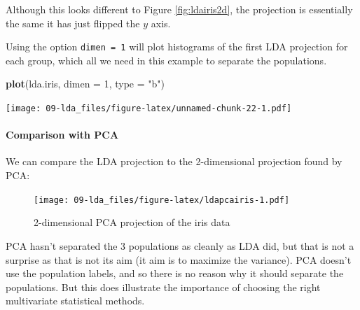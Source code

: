 \documentclass[
]{book}
\newenvironment{Shaded}{\begin{snugshade}}{\end{snugshade}}
\newcommand{\AttributeTok}[1]{\textcolor[rgb]{0.13,0.29,0.53}{#1}}
\newcommand{\DecValTok}[1]{\textcolor[rgb]{0.00,0.00,0.81}{#1}}
\newcommand{\FunctionTok}[1]{\textcolor[rgb]{0.13,0.29,0.53}{\textbf{#1}}}
\newcommand{\NormalTok}[1]{#1}
\newcommand{\OtherTok}[1]{\textcolor[rgb]{0.56,0.35,0.01}{#1}}
\newcommand{\SpecialCharTok}[1]{\textcolor[rgb]{0.81,0.36,0.00}{\textbf{#1}}}
\newcommand{\StringTok}[1]{\textcolor[rgb]{0.31,0.60,0.02}{#1}}
\theoremstyle{definition}
\theoremstyle{definition}
\theoremstyle{definition}
\theoremstyle{definition}
\theoremstyle{remark}
\begin{document}
Although this looks different to Figure \ref{fig:ldairis2d}, the projection is essentially the same it has just flipped the \(y\) axis.

Using the option \texttt{dimen\ =\ 1} will plot histograms of the first LDA projection for each group, which all we need in this example to separate the populations.

\begin{Shaded}
\begin{Highlighting}[]
\FunctionTok{plot}\NormalTok{(lda.iris, }\AttributeTok{dimen =} \DecValTok{1}\NormalTok{, }\AttributeTok{type =} \StringTok{"b"}\NormalTok{)}
\end{Highlighting}
\end{Shaded}

\texttt{[image: 09-lda\_files/figure-latex/unnamed-chunk-22-1.pdf]}

\hypertarget{comparison-with-pca}{%
\paragraph*{Comparison with PCA}\label{comparison-with-pca}}

We can compare the LDA projection to the 2-dimensional projection found by PCA:

\begin{Shaded}
\end{Shaded}

\begin{figure}
\centering
\texttt{[image: 09-lda\_files/figure-latex/ldapcairis-1.pdf]}
\caption{\label{fig:ldapcairis}2-dimensional PCA projection of the iris data}
\end{figure}

PCA hasn't separated the 3 populations as cleanly as LDA did, but that is not a surprise as that is not its aim (it aim is to maximize the variance). PCA doesn't use the population labels, and so there is no reason why it should separate the populations. But this does illustrate the importance of choosing the right multivariate statistical methods.
\end{document}
